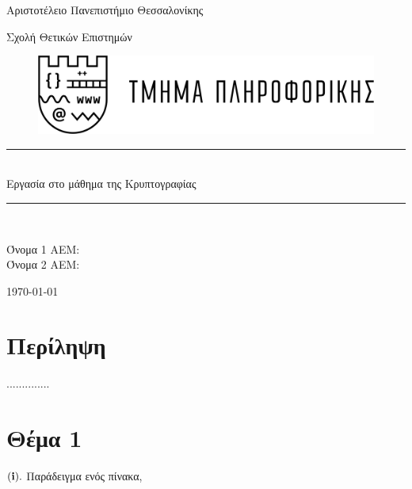 \documentclass[12pt]{article}
\numberwithin{equation}{section}
\newcommand\blankpage{%
    \null
    \thispagestyle{empty}%
    \addtocounter{page}{-1}%
    \newpage}
\newcommand{\HRule}{\rule{\linewidth}{0.5mm}}
\begin{document}
\begin{titlepage}

{\LARGE Αριστοτέλειο Πανεπιστήμιο Θεσσαλονίκης}
\begin{center} {\Large Σχολή Θετικών Επιστημών} \end{center}
\begin{figure}[h]
\raggedright
\hspace{90pt}
\includegraphics[width=0.5\linewidth]{logo.png}
\end{figure}
\begin{center}


\begin{figure}[h]
\centering 
\end{figure}
\begin{center}

\HRule \\[0.4cm]
{\huge Εργασία στο μάθημα της Κρυπτογραφίας}

\HRule \\[0.4cm]
\end{center}

\vfill
\begin{doublespacing}

{\LARGE 
Όνομα 1 ΑΕΜ: \\}
{\LARGE 
Όνομα 2 ΑΕΜ: \\}


\vfill 
{\Large \today}
\end{doublespacing}
\end{center}
\end{titlepage}


\tableofcontents

\clearpage


\section*{{\color{maroon}Περίληψη}}

..............
\blankpage



\section*{{\color{maroon}Θέμα 1}}
$({\bf i}).$ Παράδειγμα ενός πίνακα,
\end{document}
